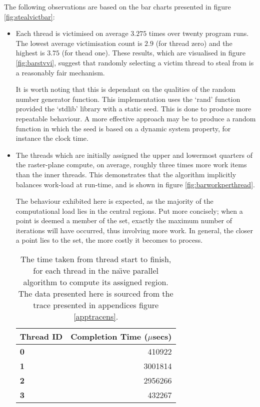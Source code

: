 

The following observations are based on the bar charts presented in figure \ref{fig:stealvictbar}:

\begin{itemize}
\item 
    Each thread is victimised on average \(3.275\) times over twenty program runs. 
    The lowest average victimisation count is \(2.9\) (for thread zero) and the highest is \(3.75\) (for thead one).
    These results, which are visualised in figure \ref{fig:barstvvi}, suggest that randomly selecting a victim 
    thread to steal from is a reasonably fair mechanism.

    It is worth noting that this is dependant on the qualities of the random number generator function.
    This implementation uses the `rand' function provided the `stdlib' library with a static seed. This is done to 
    produce more repeatable behaviour. 
    A more effective approach may be to produce a random function in which the seed is based on a dynamic system property,
    for instance the clock time. 

\item 
    The threads which are initially assigned the upper and lowermost quarters of the raster-plane compute, on average, roughly three times 
    more work items than the inner threads. 
    This demonstrates that the algorithm implicitly balances work-load at run-time, and is shown in figure \ref{fig:barworkperthread}.
    
    The behaviour exhibited here is expected, as the majority of the computational load lies in the central regions. 
    Put more concisely; when a point is deemed a member of the set, exactly the maximum number of iterations will have occurred, thus 
    involving more work. In general, the closer a point lies to the set, the more costly it becomes to process.

\begin{table}[H]
    \centering
    \begin{tabular}{|l|r|}
        \hline
            \textbf{Thread ID} & \textbf{Completion Time} (\(\mu\)secs) \\
        \hline \hline
            \textbf{0} & 410922 \\
            \hline
            \textbf{1} & 3001814 \\
            \textbf{2} & 2956266 \\
            \hline
            \textbf{3} & 432267 \\
            \hline
    \end{tabular}
    \label{tab:npartab}
    \caption{The time taken from thread start to finish, for each thread in the na\"{\i}ve parallel algorithm to compute its assigned region.
The data presented here is sourced from the trace presented in appendices figure \ref{apptracens}.}
\end{table}


\end{itemize}
